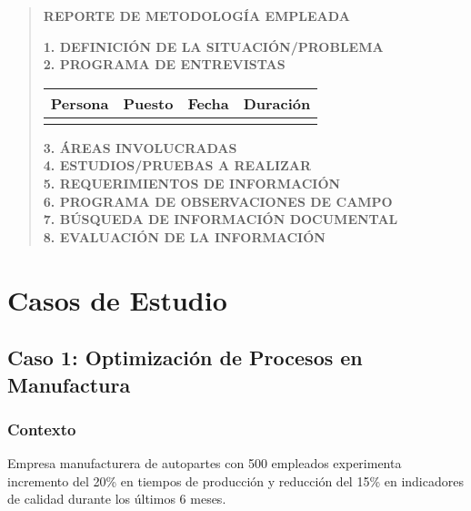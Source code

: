 \documentclass[12pt,letterpaper,oneside]{book}
\begin{document}
\begin{quote}
\textbf{REPORTE DE METODOLOGÍA EMPLEADA}

\textbf{1. DEFINICIÓN DE LA SITUACIÓN/PROBLEMA}\\
[Descripción clara y precisa del problema a investigar]

\textbf{2. PROGRAMA DE ENTREVISTAS}\\
\begin{tabular}{|l|l|l|l|}
\hline
\textbf{Persona} & \textbf{Puesto} & \textbf{Fecha} & \textbf{Duración} \\
\hline
& & & \\
\hline
\end{tabular}

\textbf{3. ÁREAS INVOLUCRADAS}\\
[Lista de áreas organizacionales afectadas por el problema]

\textbf{4. ESTUDIOS/PRUEBAS A REALIZAR}\\
[Descripción de análisis técnicos o pruebas necesarias]

\textbf{5. REQUERIMIENTOS DE INFORMACIÓN}\\
[Especificación de datos e información necesaria]

\textbf{6. PROGRAMA DE OBSERVACIONES DE CAMPO}\\
[Plan detallado de observaciones directas]

\textbf{7. BÚSQUEDA DE INFORMACIÓN DOCUMENTAL}\\
[Estrategia para recopilar información documental]

\textbf{8. EVALUACIÓN DE LA INFORMACIÓN}\\
[Metodología para validar y analizar información obtenida]
\end{quote}

\chapter{Casos de Estudio}

\section{Caso 1: Optimización de Procesos en Manufactura}

\subsection{Contexto}

Empresa manufacturera de autopartes con 500 empleados experimenta incremento del 20\% en tiempos de producción y reducción del 15\% en indicadores de calidad durante los últimos 6 meses.
\end{document}
